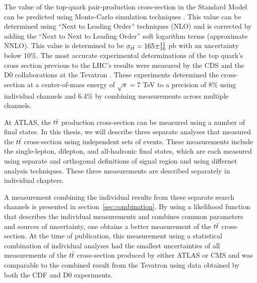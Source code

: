 The value of the top-quark pair-production cross-section in the Standard Model can be predicted using Monte-Carlo simulation techniques \cite{TOP_XSC_THEORY} \cite{Langenfeld:2009ue} \cite{THRESHOLD_EXPANSION_XSC}.
This value can be determined using ``Next to Leading Order'' techniques (NLO) and is corrected by adding the ``Next to Next to Leading Order'' soft logarithm terms (approximate NNLO).
This value is determined to be $\sigma_{t\bar{t}} = 165 \pm ^{11}_{16}$ pb with an uncertainty below 10\%.
The most accurate experimental determinations of the top quark's cross section previous to the LHC's results were measured by the CDS and the D0 collaborations at the Tevatron \cite{TEVATRON_XSC_LJETS} \cite{TEVATRON_XSC_DILEP}.
These experiments determined the cross-section at a center-of-mass energy of $\sqrt{s} = 7$ TeV to a precision of 8\% using individual channels and 6.4\% by combining measurements across multiple channels.

At ATLAS, the $t\bar{t}$ production cross-section can be measured using a number of final states.
In this thesis, we will describe three separate analyses that measured the $t\bar{t}$ cross-section using independent sets of events.
These measurements include the single-lepton, dilepton, and all-hadronic final states, which are each measured using separate and orthogonal
definitions of signal region and using differnet analysis techniques.
These three measurements are described separately in individual chapters.

A measurement combining the individual results from these separate search channels is presented in section~\ref{sec:combination}.
By using a likelihood function that describes the individual measurements and combines common parameters and sources of uncertainty,
one obtains a better measurement of the $t\bar{t}$ cross-section.
At the time of publication, this measurement using a statistical combination of individual analyses had the smallest uncertainties
of all measurements of the $t\bar{t}$ cross-section produced by either ATLAS or CMS and was comparable to the combined result from 
the Tevatron using data obtained by both the CDF and D0 experiments.


